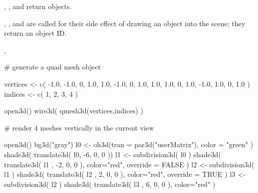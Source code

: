 \begin{Value}
, , and  return  objects.

, , and  are called for their side effect
of drawing an object into the scene; they return an object ID.
\end{Value}
\begin{SeeAlso}\relax
{}, 
\end{SeeAlso}
\begin{Examples}
\begin{ExampleCode}

  # generate a quad mesh object

  vertices <- c( 
     -1.0, -1.0, 0, 1.0,
      1.0, -1.0, 0, 1.0,
      1.0,  1.0, 0, 1.0,
     -1.0,  1.0, 0, 1.0
  )
  indices <- c( 1, 2, 3, 4 )
  
  open3d()  
  wire3d( qmesh3d(vertices,indices) )
  
  # render 4 meshes vertically in the current view

  open3d()  
  bg3d("gray")
  l0 <- oh3d(tran = par3d("userMatrix"), color = "green" )
  shade3d( translate3d( l0, -6, 0, 0 ))
  l1 <- subdivision3d( l0 )
  shade3d( translate3d( l1 , -2, 0, 0 ), color="red", override = FALSE )
  l2 <- subdivision3d( l1 )
  shade3d( translate3d( l2 , 2, 0, 0 ), color="red", override = TRUE )
  l3 <- subdivision3d( l2 )
  shade3d( translate3d( l3 , 6, 0, 0 ), color="red" )
  
\end{ExampleCode}
\end{Examples}


